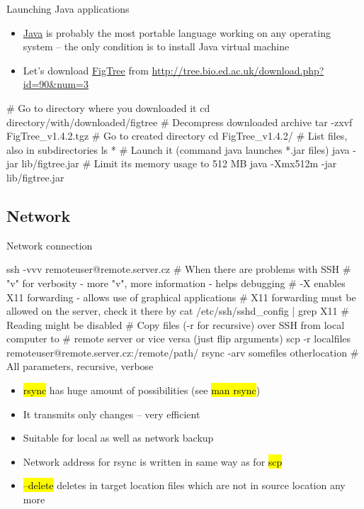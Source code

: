 \documentclass[compress, ucs, xelatex, 11pt, xcolor=svgnames,
  hyperref={
    bookmarks=true,
    unicode=true,
    colorlinks=true,
    pdftitle={Linux, command line and MetaCentrum},
    plainpages=false,
    pdfauthor={Vojtech Zeisek},
    pdfsubject={Course about use of Linux command line, writing shell scripts and using MetaCentrum of CESNET},
    pdfcreator={XeLaTeX},
    pdfkeywords={Linux, GNU, BASH, shell, command line, MetaCentrum},
    linkcolor=Red,
    anchorcolor=Blue,
    citecolor=Purple,
    filecolor=DodgerBlue,
    menucolor=DarkOrchid,
    urlcolor=DeepSkyBlue,
    pdftex},
  url={hyphens, lowtilde} %
  ]{beamer}
\renewcommand{\texttt}[1]{\hl{\ttfamily #1}}
\begin{document}
\begin{frame}[fragile]{Launching Java applications}
\begin{itemize}
  \item \href{https://www.java.com/}{Java} is probably the most portable language working on any operating system -- the only condition is to install Java virtual machine
  \item Let's download \href{http://tree.bio.ed.ac.uk/software/figtree/}{FigTree} from \url{http://tree.bio.ed.ac.uk/download.php?id=90&num=3}
\end{itemize}
  \begin{bashcode}
    # Go to directory where you downloaded it
    cd directory/with/downloaded/figtree
    # Decompress downloaded archive
    tar -zxvf FigTree_v1.4.2.tgz
    # Go to created directory
    cd FigTree_v1.4.2/
    # List files, also in subdirectories
    ls *
    # Launch it (command java launches *.jar files)
    java -jar lib/figtree.jar
    # Limit its memory usage to 512 MB
    java -Xmx512m -jar lib/figtree.jar
  \end{bashcode}
\end{frame}

\subsection{Network}

\begin{frame}[fragile]{Network connection}
  \begin{bashcode}
    ssh -vvv remoteuser@remote.server.cz # When there are problems with SSH
      # "v" for verbosity - more "v", more information - helps debugging
      # -X enables X11 forwarding - allows use of graphical applications
      # X11 forwarding must be allowed on the server, check it there by
    cat /etc/ssh/sshd_config | grep X11 # Reading might be disabled
    # Copy files (-r for recursive) over SSH from local computer to
    # remote server or vice versa (just flip arguments)
    scp -r localfiles remoteuser@remote.server.cz:/remote/path/
    rsync -arv somefiles otherlocation # All parameters, recursive, verbose
  \end{bashcode}
\begin{itemize}
  \item \texttt{rsync} has huge amount of possibilities (see \texttt{man rsync})
  \item It transmits only changes -- very efficient
  \item Suitable for local as well as network backup
  \item Network address for rsync is written in same way as for \texttt{scp}
  \item \texttt{--delete} deletes in target location files which are not in source location any more
\end{itemize}
\end{frame}
\end{document}

